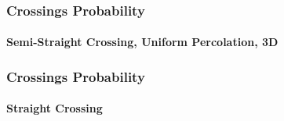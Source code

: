 \documentclass{beamer}
\begin{document}
	\begin{frame}
		\frametitle{Crossings Probability}
		\framesubtitle{Semi-Straight Crossing, Uniform Percolation, 3D}
	\end{frame}
	
	
	
	\begin{frame}
		\frametitle{Crossings Probability}
		\framesubtitle{Straight Crossing}
	\end{frame}

\end{document}
